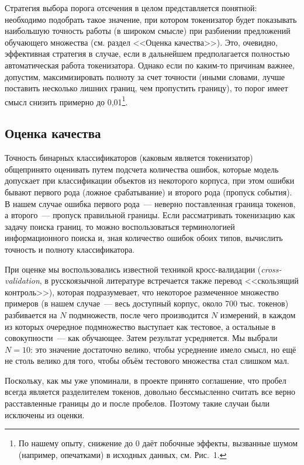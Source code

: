 \documentclass[a4paper]{article}
\begin{document}
Стратегия выбора порога отсечения в целом представляется понятной: необходимо подобрать такое значение, при котором токенизатор будет показывать наибольшую точность работы (в широком смысле) при разбиении предложений обучающего множества (см. раздел <<Оценка качества>>). Это, очевидно, эффективная стратегия в случае, если в дальнейшем предполагается полностью автоматическая работа токенизатора. Однако если по каким-то причинам важнее, допустим, максимизировать полноту за счет точности (иными словами, лучше поставить несколько лишних границ, чем пропустить границу), то порог имеет смысл снизить примерно до 0,01\footnote{По нашему опыту, снижение до 0 даёт побочные эффекты, вызванные шумом (например, опечатками) в исходных данных, см. Рис.~1.}.
\subsection{Оценка качества}
Точность бинарных классификаторов (каковым является токенизатор) общепринято оценивать путем подсчета количества ошибок, которые модель допускает при классификации объектов из некоторого корпуса, при этом ошибки бывают первого рода (ложное срабатывание) и второго рода (пропуск события). В нашем случае ошибка первого рода~--- неверно поставленная граница токенов, а второго~--- пропуск правильной границы. Если рассматривать токенизацию как задачу поиска границ, то можно воспользоваться терминологией информационного поиска и, зная количество ошибок обоих типов, вычислить точность и полноту классификатора.

При оценке мы воспользовались известной техникой кросс-валидации (\textit{cross-validation}, в русскоязычной литературе встречается также перевод <<скользящий контроль>>)\cite{kohavi_crossval}, которая подразумевает, что некоторое размеченное множество примеров (в нашем случае~--- весь доступный корпус, около 700 тыс. токенов) разбивается на $N$ подмножеств, после чего производится $N$ измерений, в каждом из которых очередное подмножество выступает как тестовое, а остальные в совокупности~--- как обучающее. Затем результат усредняется. Мы выбрали $N = 10$: это значение достаточно велико, чтобы усреднение имело смысл, но ещё не столь велико для того, чтобы объём тестового множества стал слишком мал.

Поскольку, как мы уже упоминали, в проекте принято соглашение, что пробел всегда является разделителем токенов, довольно бессмысленно считать все верно расставленные границы до и после пробелов. Поэтому такие случаи были исключены из оценки.
\end{document}
